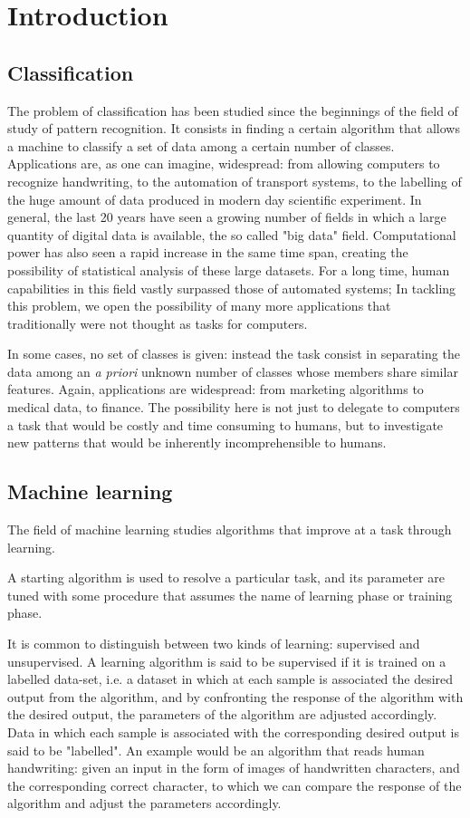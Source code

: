 \documentclass[a4paper]{report}
\begin{document}
\tableofcontents

\listoftodos

\chapter{Introduction}
\section{Classification}
The problem of classification has been studied since the beginnings of the field of study of pattern recognition.
It consists in finding a certain algorithm that allows a machine to classify a set of data among a certain number of classes.
Applications are, as one can imagine, widespread:
from allowing computers to recognize handwriting, to the automation of transport systems, to the labelling of the huge amount of data produced in modern day scientific experiment.
In general, the last 20 years have seen a growing number of fields in which a large quantity of digital data is available, the so called "big data" field.
Computational power has also seen a rapid increase in the same time span, creating the possibility of statistical analysis of these large datasets.
For a long time, human capabilities in this field vastly surpassed those of automated systems;
In tackling this problem, we open the possibility of many more applications that traditionally were not thought as  tasks for computers.

In some cases, no set of classes is given:
instead the task consist in separating the data among an \textit{a priori} unknown number of classes whose members share similar features.
Again, applications are widespread:
from marketing algorithms to medical data, to finance.
The possibility here is not just to delegate to computers a task that would be costly and time consuming to humans, but to investigate new patterns that would be inherently incomprehensible to humans.

\section{Machine learning}
The field of machine learning studies algorithms that improve at a task through learning.

A starting algorithm is used to resolve a particular task, and its parameter are tuned with some procedure that assumes the name of learning phase or training phase.

It is common to distinguish between two kinds of learning:
supervised and unsupervised.
A learning algorithm is said to be supervised if it is trained on a labelled data-set, i.e.
a dataset in which at each sample is associated the desired output from the algorithm, and by confronting the response of the algorithm with the desired output, the parameters of the algorithm are adjusted accordingly.
Data in which each sample is associated with the corresponding desired output is said to be "labelled".
An example would be an algorithm that reads human handwriting:
given an input in the form of images of handwritten characters, and the corresponding correct character, to which we can compare the response of the algorithm and adjust the parameters accordingly.
\end{document}
